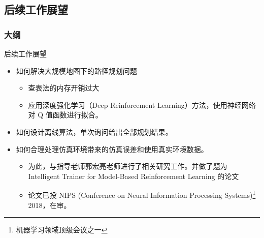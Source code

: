 \documentclass{beamer}
\begin{document}
\subsection{后续工作展望}
\begin{frame}
\frametitle{大纲} %
\tableofcontents
    [
        currentsection,
        currentsubsection,
        subsectionstyle=show/shaded/hide
    ]
\end{frame}
\begin{frame}{后续工作展望}
    \begin{itemize}
        \item 如何解决大规模地图下的路径规划问题
        \begin{itemize}
            \item 查表法的内存开销过大
            \item 应用深度强化学习（Deep Reinforcement Learning）方法，使用神经网络对 Q 值函数进行拟合。

        \end{itemize}
        \item 如何设计离线算法，单次询问给出全部规划结果。
        \item 如何合理处理仿真环境带来的仿真误差和使用真实环境数据。
        \begin{itemize}
            \item 为此，与指导老师郭宏亮老师进行了相关研究工作。并做了题为 Intelligent Trainer for Model-Based Reinforcement Learning 的论文
            \item 论文已投 NIPS (Conference on Neural Information Processing Systems)\footnote{机器学习领域顶级会议之一} 2018，在审。
        \end{itemize}
    \end{itemize}
\end{frame}



\end{document}
